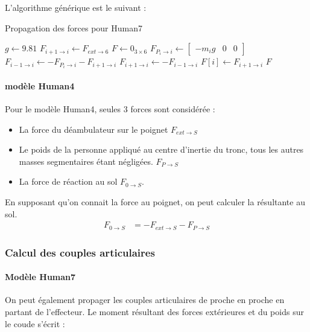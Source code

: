 \documentclass[a4paper, 10pt ]{article}
\begin{document}
L'algorithme générique est le suivant : 
\begin{algorithm}[h]
\caption{Propagation des forces pour Human7}
\begin{algorithmic}[1]
\STATE $g \leftarrow 9.81$
\STATE $F_{i+1\rightarrow i} \leftarrow F_{ext\rightarrow 6}$
\STATE $F\leftarrow 0_{3\times6}$
	\STATE$F_{P_{i}\rightarrow i} \leftarrow \begin{bmatrix}-m_ig& 0& 0 \end{bmatrix}$
	\STATE$F_{i-1\rightarrow i} \leftarrow - F_{P_{i}\rightarrow i} -F_{i+1\rightarrow i} $
	\STATE $F_{i+1\rightarrow i}  \leftarrow -F_{i-1\rightarrow i}$
	\STATE $F[i] \leftarrow F_{i+1\rightarrow i}$
\ENDFOR
\RETURN $F$
\end{algorithmic}
\end{algorithm}


\paragraph{modèle Human4}

Pour le modèle Human4, seules 3 forces sont considérée : 
\begin{itemize}
\item La  force du déambulateur sur le poignet $F_{ext\rightarrow S}$
\item Le poids de la personne appliqué au centre d'inertie du tronc, tous les autres masses segmentaires étant négligées. $F_{P\rightarrow S}$
\item La force de réaction au sol $F_{0\rightarrow S}$.
\end{itemize}

En supposant qu'on connait la force au poignet, on peut calculer la résultante au sol.
\begin{align}
F_{0\rightarrow S} &= -F_{ext\rightarrow S}-F_{P\rightarrow S}
\end{align}



\subsubsection{Calcul des couples articulaires}

\paragraph{Modèle Human7}
On peut également propager les couples articulaires de proche en proche en partant de l'effecteur.
Le moment résultant des forces extérieures et du poids sur le coude s'écrit :
\end{document}
